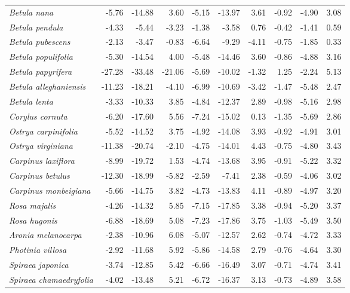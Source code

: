 \documentclass[11pt]{article}
\begin{document}
\begin{longtable}{lrrrrrrrrr}
  \emph{Betula nana} & -5.76 & -14.88 & 3.60 & -5.15 & -13.97 & 3.61 & -0.92 & -4.90 & 3.08 \\ 
  \emph{Betula pendula} & -4.33 & -5.44 & -3.23 & -1.38 & -3.58 & 0.76 & -0.42 & -1.41 & 0.59 \\ 
  \emph{Betula pubescens} & -2.13 & -3.47 & -0.83 & -6.64 & -9.29 & -4.11 & -0.75 & -1.85 & 0.33 \\ 
  \emph{Betula populifolia} & -5.30 & -14.54 & 4.00 & -5.48 & -14.46 & 3.60 & -0.86 & -4.88 & 3.16 \\ 
  \emph{Betula papyrifera} & -27.28 & -33.48 & -21.06 & -5.69 & -10.02 & -1.32 & 1.25 & -2.24 & 5.13 \\ 
  \emph{Betula alleghaniensis} & -11.23 & -18.21 & -4.10 & -6.99 & -10.69 & -3.42 & -1.47 & -5.48 & 2.47 \\ 
  \emph{Betula lenta} & -3.33 & -10.33 & 3.85 & -4.84 & -12.37 & 2.89 & -0.98 & -5.16 & 2.98 \\ 
  \emph{Corylus cornuta} & -6.20 & -17.60 & 5.56 & -7.24 & -15.02 & 0.13 & -1.35 & -5.69 & 2.86 \\ 
  \emph{Ostrya carpinifolia} & -5.52 & -14.52 & 3.75 & -4.92 & -14.08 & 3.93 & -0.92 & -4.91 & 3.01 \\ 
  \emph{Ostrya virginiana} & -11.38 & -20.74 & -2.10 & -4.75 & -14.01 & 4.43 & -0.75 & -4.80 & 3.43 \\ 
  \emph{Carpinus laxiflora} & -8.99 & -19.72 & 1.53 & -4.74 & -13.68 & 3.95 & -0.91 & -5.22 & 3.32 \\ 
  \emph{Carpinus betulus} & -12.30 & -18.99 & -5.82 & -2.59 & -7.41 & 2.38 & -0.59 & -4.06 & 3.02 \\ 
  \emph{Carpinus monbeigiana} & -5.66 & -14.75 & 3.82 & -4.73 & -13.83 & 4.11 & -0.89 & -4.97 & 3.20 \\ 
  \emph{Rosa majalis} & -4.26 & -14.32 & 5.85 & -7.15 & -17.85 & 3.38 & -0.94 & -5.20 & 3.37 \\ 
  \emph{Rosa hugonis} & -6.88 & -18.69 & 5.08 & -7.23 & -17.86 & 3.75 & -1.03 & -5.49 & 3.50 \\ 
  \emph{Aronia melanocarpa} & -2.38 & -10.96 & 6.08 & -5.07 & -12.57 & 2.62 & -0.74 & -4.72 & 3.33 \\ 
  \emph{Photinia villosa} & -2.92 & -11.68 & 5.92 & -5.86 & -14.58 & 2.79 & -0.76 & -4.64 & 3.30 \\ 
  \emph{Spiraea japonica} & -3.74 & -12.85 & 5.42 & -6.66 & -16.49 & 3.07 & -0.71 & -4.74 & 3.41 \\ 
  \emph{Spiraea chamaedryfolia} & -4.02 & -13.48 & 5.21 & -6.72 & -16.37 & 3.13 & -0.73 & -4.89 & 3.58 \\ 

\end{longtable}
\end{document}
